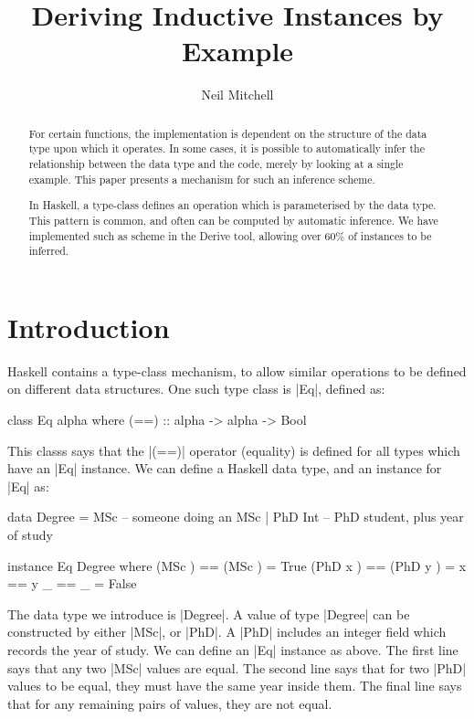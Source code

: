 \documentclass{llncs}
\begin{document}
\title{Deriving Inductive Instances by Example}
\author{Neil Mitchell}


\maketitle

\begin{abstract}
For certain functions, the implementation is dependent on the structure of the data type upon which it operates. In some cases, it is possible to automatically infer the relationship between the data type and the code, merely by looking at a single example. This paper presents a mechanism for such an inference scheme.

In Haskell, a type-class defines an operation which is parameterised by the data type. This pattern is common, and often can be computed by automatic inference. We have implemented such as scheme in the Derive tool, allowing over 60\% of instances to be inferred.
\end{abstract}

\section{Introduction}

Haskell contains a type-class mechanism, to allow similar operations to be defined on different data structures. One such type class is |Eq|, defined as:

\begin{code}
class Eq alpha where
    (==) :: alpha -> alpha -> Bool
\end{code}

This classs says that the |(==)| operator (equality) is defined for all types which have an |Eq| instance. We can define a Haskell data type, and an instance for |Eq| as:

\begin{code}
data Degree  =  MSc        -- someone doing an MSc
             |  PhD Int    -- PhD student, plus year of study

instance Eq Degree where
    (MSc    )  == (MSc    )  = True
    (PhD x  )  == (PhD y  )  = x == y
    _          == _          = False
\end{code}

The data type we introduce is |Degree|. A value of type |Degree| can be constructed by either |MSc|, or |PhD|. A |PhD| includes an integer field which records the year of study. We can define an |Eq| instance as above. The first line says that any two |MSc| values are equal. The second line says that for two |PhD| values to be equal, they must have the same year inside them. The final line says that for any remaining pairs of values, they are not equal.
\end{document}
